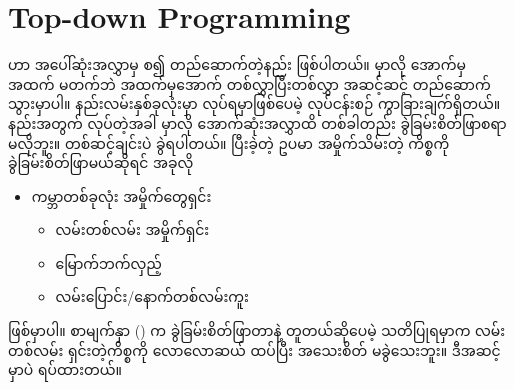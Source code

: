 \section{Top-down Programming}
 ဟာ အပေါ်ဆုံးအလွှာမှ စ၍ တည်ဆောက်တဲ့နည်း ဖြစ်ပါတယ်။  မှာလို အောက်မှ အထက် မတက်ဘဲ အထက်မှအောက် တစ်လွှာပြီးတစ်လွှာ အဆင့်ဆင့် တည်ဆောက်သွားမှာပါ။  နည်းလမ်းနှစ်ခုလုံးမှာ  လုပ်ရမှာဖြစ်ပေမဲ့ လုပ်ငန်းစဉ် ကွာခြားချက်ရှိတယ်။  နည်းအတွက်  လုပ်တဲ့အခါ   မှာလို အောက်ဆုံးအလွှာထိ တစ်ခါတည်း  ခွဲခြမ်းစိတ်ဖြာစရာမလိုဘူး။ တစ်ဆင့်ချင်းပဲ ခွဲရပါတယ်။ ပြီးခဲ့တဲ့ ဥပမာ အမှိုက်သိမ်းတဲ့ ကိစ္စကို ခွဲခြမ်းစိတ်ဖြာမယ်ဆိုရင် အခုလို

%
\begin{itemize}
    \item ကမ္ဘာတစ်ခုလုံး အမှိုက်တွေရှင်း 
    \begin{itemize}
        \item လမ်းတစ်လမ်း အမှိုက်ရှင်း       
        \item မြောက်ဘက်လှည့် 
        \item လမ်းပြောင်း/နောက်တစ်လမ်းကူး 
    \end{itemize}
\end{itemize}
%
ဖြစ်မှာပါ။ စာမျက်နှာ (\fRefNo{\pageref{fig:btmup_pd}}) က ခွဲခြမ်းစိတ်ဖြာတာနဲ့ တူတယ်ဆိုပေမဲ့ သတိပြုရမှာက လမ်းတစ်လမ်း ရှင်းတဲ့ကိစ္စကို လောလောဆယ် ထပ်ပြီး အသေးစိတ် မခွဲသေးဘူး။ ဒီအဆင့်မှာပဲ ရပ်ထားတယ်။ 

